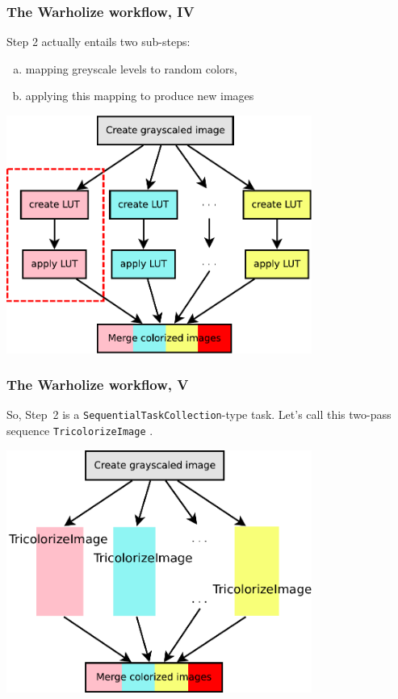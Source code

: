 \documentclass[english,serif,mathserif,xcolor=pdftex,dvipsnames,table]{beamer}
\begin{document}
\begin{frame}
  \frametitle{The Warholize workflow, IV}

  Step 2 actually entails two sub-steps:
  \begin{enumerate}[a)]
  \item mapping greyscale levels to random colors,
  \item applying this mapping to produce new images
  \end{enumerate}

  \+
  \includegraphics[width=0.75\textwidth]{fig/warholize-wkf2a}
\end{frame}


\begin{frame}
  \frametitle{The Warholize workflow, V}

  So, Step~2 is a \texttt{SequentialTaskCollection}-type task. Let's
  call this two-pass sequence \texttt{TricolorizeImage} .

  \+
  \includegraphics[width=0.75\textwidth]{fig/warholize-TricolorizeImage}
\end{frame}
\end{document}
